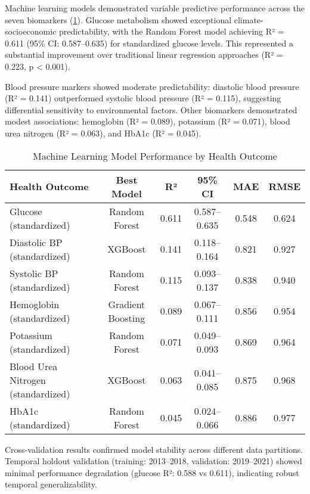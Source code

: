 \documentclass[journal,article,submit,pdftex,moreauthors]{Definitions/mdpi}
\begin{document}
Machine learning models demonstrated variable predictive performance across the seven biomarkers (\cref{tab:model_performance}). Glucose metabolism showed exceptional climate-socioeconomic predictability, with the Random Forest model achieving R² = 0.611 (95\% CI: 0.587--0.635) for standardized glucose levels. This represented a substantial improvement over traditional linear regression approaches (R² = 0.223, p < 0.001).

Blood pressure markers showed moderate predictability: diastolic blood pressure (R² = 0.141) outperformed systolic blood pressure (R² = 0.115), suggesting differential sensitivity to environmental factors. Other biomarkers demonstrated modest associations: hemoglobin (R² = 0.089), potassium (R² = 0.071), blood urea nitrogen (R² = 0.063), and HbA1c (R² = 0.045).

\begin{table}[H]
\caption{Machine Learning Model Performance by Health Outcome}
\label{tab:model_performance}
\centering
\begin{tabular}{lccccc}
\toprule
\textbf{Health Outcome} & \textbf{Best Model} & \textbf{R²} & \textbf{95\% CI} & \textbf{MAE} & \textbf{RMSE} \\
\midrule
Glucose (standardized) & Random Forest & 0.611 & 0.587--0.635 & 0.548 & 0.624 \\
Diastolic BP (standardized) & XGBoost & 0.141 & 0.118--0.164 & 0.821 & 0.927 \\
Systolic BP (standardized) & Random Forest & 0.115 & 0.093--0.137 & 0.838 & 0.940 \\
Hemoglobin (standardized) & Gradient Boosting & 0.089 & 0.067--0.111 & 0.856 & 0.954 \\
Potassium (standardized) & Random Forest & 0.071 & 0.049--0.093 & 0.869 & 0.964 \\
Blood Urea Nitrogen (standardized) & XGBoost & 0.063 & 0.041--0.085 & 0.875 & 0.968 \\
HbA1c (standardized) & Random Forest & 0.045 & 0.024--0.066 & 0.886 & 0.977 \\
\bottomrule
\end{tabular}
\end{table}

Cross-validation results confirmed model stability across different data partitions. Temporal holdout validation (training: 2013--2018, validation: 2019--2021) showed minimal performance degradation (glucose R²: 0.588 vs 0.611), indicating robust temporal generalizability.
\end{document}
